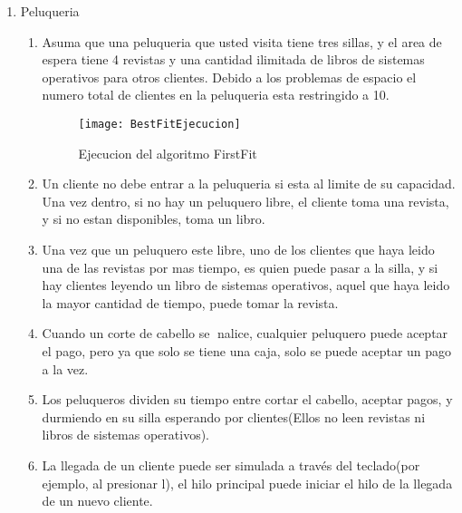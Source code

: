\documentclass[a4paperx]{article}
\begin{document}
\begin{enumerate}
\begin{enumerate}
\end{enumerate}

\item{Peluqueria}\\

\begin{enumerate}

\item{Asuma que una peluqueria que usted visita tiene tres sillas, y el
area de espera tiene 4 revistas y una cantidad ilimitada de libros de
sistemas operativos para otros clientes. Debido a los problemas de
espacio el numero total de clientes en la peluqueria esta restringido
a 10.}\\

\begin{figure}[H]
\centering
\texttt{[image: BestFitEjecucion]}
\caption{Ejecucion del algoritmo FirstFit}
\end{figure}

\item{Un cliente no debe entrar a la peluqueria si esta al limite de su
capacidad. Una vez dentro, si no hay un peluquero libre, el cliente
toma una revista, y si no estan disponibles, toma un libro.}\\

\item{Una vez que un peluquero este libre, uno de los clientes que haya
leido una de las revistas por mas tiempo, es quien puede pasar a la
silla, y si hay clientes leyendo un libro de sistemas operativos, aquel
que haya leido la mayor cantidad de tiempo, puede tomar la revista.}\\

\item{Cuando un corte de cabello se nalice, cualquier peluquero puede
aceptar el pago, pero ya que solo se tiene una caja, solo se puede
aceptar un pago a la vez.}\\

\item{Los peluqueros dividen su tiempo entre cortar el cabello, aceptar
pagos, y durmiendo en su silla esperando por clientes(Ellos no leen
revistas ni libros de sistemas operativos).}\\

\item{La llegada de un cliente puede ser simulada a trav\'es del teclado(por
ejemplo, al presionar l), el hilo principal puede iniciar el hilo de la
llegada de un nuevo cliente.}\\


\end{enumerate}
\end{enumerate}
\end{document}

